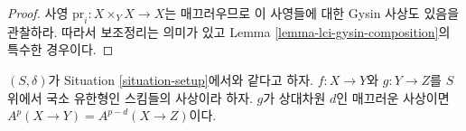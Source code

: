\begin{proof}
사영 $\text{pr}_i : X \times_Y X \to X$는 매끄러우므로 이 사영들에
대한 Gysin 사상도 있음을 관찰하라. 따라서 보조정리는 의미가 있고
Lemma \ref{lemma-lci-gysin-composition}의 특수한 경우이다.
\end{proof}

\begin{proposition}
\label{proposition-compute-bivariant}
\begin{reference}
\cite[Proposition 17.4.2]{F}
\end{reference}
$(S, \delta)$가 Situation \ref{situation-setup}에서와 같다고 하자.
$f : X \to Y$와 $g : Y \to Z$를 $S$ 위에서 국소 유한형인 스킴들의
사상이라 하자. $g$가 상대차원 $d$인 매끄러운 사상이면
$A^p(X \to Y) = A^{p - d}(X \to Z)$이다.
\end{proposition}

